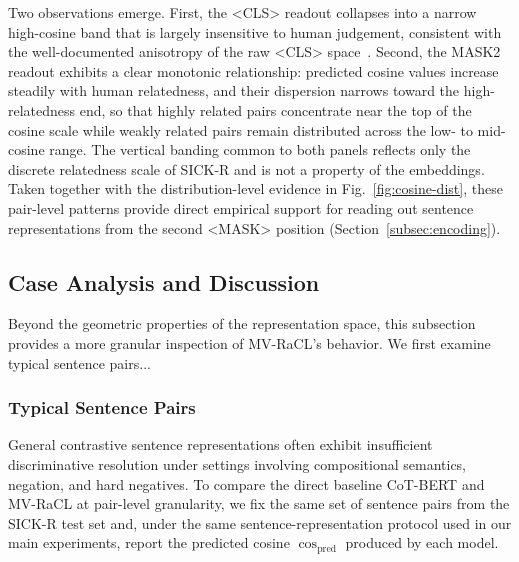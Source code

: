\documentclass[lettersize,journal]{IEEEtran}
\begin{document}
Two observations emerge. First, the <CLS> readout collapses into a narrow high-cosine band that is largely insensitive to human judgement, consistent with the well-documented anisotropy of the raw <CLS> space~\cite{kurz2026tacl}. Second, the MASK2 readout exhibits a clear monotonic relationship: predicted cosine values increase steadily with human relatedness, and their dispersion narrows toward the high-relatedness end, so that highly related pairs concentrate near the top of the cosine scale while weakly related pairs remain distributed across the low- to mid-cosine range. The vertical banding common to both panels reflects only the discrete relatedness scale of SICK-R and is not a property of the embeddings. Taken together with the distribution-level evidence in Fig.~\ref{fig:cosine-dist}, these pair-level patterns provide direct empirical support for reading out sentence representations from the second <MASK> position (Section~\ref{subsec:encoding}).

\subsection{Case Analysis and Discussion}
\label{subsec:case}

Beyond the geometric properties of the representation space, this subsection provides a more granular inspection of MV-RaCL's behavior. We first examine typical sentence pairs...

\subsubsection{Typical Sentence Pairs}

General contrastive sentence representations often exhibit insufficient discriminative resolution under settings involving compositional semantics, negation, and hard negatives. To compare the direct baseline CoT-BERT and MV-RaCL at pair-level granularity, we fix the same set of sentence pairs from the SICK-R test set and, under the same sentence-representation protocol used in our main experiments, report the predicted cosine $\cos_{\mathrm{pred}}$ produced by each model.
\end{document}
